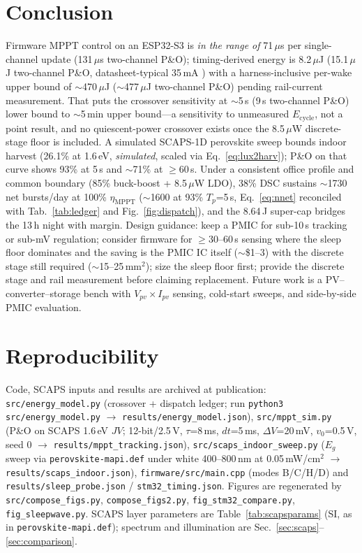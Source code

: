 \documentclass[10pt, conference, letterpaper]{IEEEtran}
\begin{document}
\section{Conclusion}

Firmware MPPT control on an ESP32-S3 is \emph{in the range of} 71\,$\mu$s per single-channel update (131\,$\mu$s two-channel P\&O); timing-derived energy is 8.2\,$\mu$J (15.1\,$\mu$J two-channel P\&O, datasheet-typical 35\,mA \cite{espressif_s3_datasheet}) with a harness-inclusive per-wake upper bound of $\sim$470\,$\mu$J ($\sim$477\,$\mu$J two-channel P\&O) pending rail-current measurement. That puts the crossover sensitivity at $\sim$5\,s (9\,s two-channel P\&O) lower bound to $\sim$5\,min upper bound---a sensitivity to unmeasured $E_{\mathrm{cycle}}$, not a point result, and no quiescent-power crossover exists once the 8.5\,$\mu$W discrete-stage floor is included. A simulated SCAPS-1D perovskite sweep bounds indoor harvest (26.1\% at 1.6\,eV, \emph{simulated}, scaled via Eq.~\ref{eq:lux2harv}); P\&O on that curve shows 93\% at 5\,s and $\sim$71\% at $\ge$60\,s. Under a consistent office profile and common boundary (85\% buck-boost + 8.5\,$\mu$W LDO), 38\% DSC sustains $\sim$1730 net bursts/day at 100\% $\eta_{\mathrm{MPPT}}$ ($\sim$1600 at 93\% $T_p$=5\,s, Eq.~\ref{eq:nnet} reconciled with Tab.~\ref{tab:ledger} and Fig.~\ref{fig:dispatch}), and the 8.64\,J super-cap bridges the 13\,h night with margin. Design guidance: keep a PMIC for sub-10\,s tracking or sub-mV regulation; consider firmware for $\ge$30--60\,s sensing where the sleep floor dominates and the saving is the PMIC IC itself ($\sim$\$1--3) with the discrete stage still required ($\sim$15--25\,mm$^2$); size the sleep floor first; provide the discrete stage and rail measurement before claiming replacement. Future work is a PV--converter--storage bench with $V_{pv}\times I_{pv}$ sensing, cold-start sweeps, and side-by-side PMIC evaluation.

\section*{Reproducibility}

Code, SCAPS inputs and results are archived at publication: \texttt{src/energy\_model.py} (crossover + dispatch ledger; run \texttt{python3 src/energy\_model.py} $\rightarrow$ \texttt{results/energy\_model.json}), \texttt{src/mppt\_sim.py} (P\&O on SCAPS 1.6\,eV $JV$; 12-bit/2.5\,V, $\tau$=8\,ms, $dt$=5\,ms, $\Delta V$=20\,mV, $v_0$=0.5\,V, seed 0 $\rightarrow$ \texttt{results/mppt\_tracking.json}), \texttt{src/scaps\_indoor\_sweep.py} ($E_g$ sweep via \texttt{perovskite-mapi.def} under white 400--800\,nm at 0.05\,mW/cm$^2$ $\rightarrow$ \texttt{results/scaps\_indoor.json}), \texttt{firmware/src/main.cpp} (modes B/C/H/D) and \texttt{results/sleep\_probe.json} / \texttt{stm32\_timing.json}. Figures are regenerated by \texttt{src/compose\_figs.py}, \texttt{compose\_figs2.py}, \texttt{fig\_stm32\_compare.py}, \texttt{fig\_sleepwave.py}. SCAPS layer parameters are Table~\ref{tab:scapsparams} (SI, as in \texttt{perovskite-mapi.def}); spectrum and illumination are Sec.~\ref{sec:scaps}--\ref{sec:comparison}.
\end{document}
